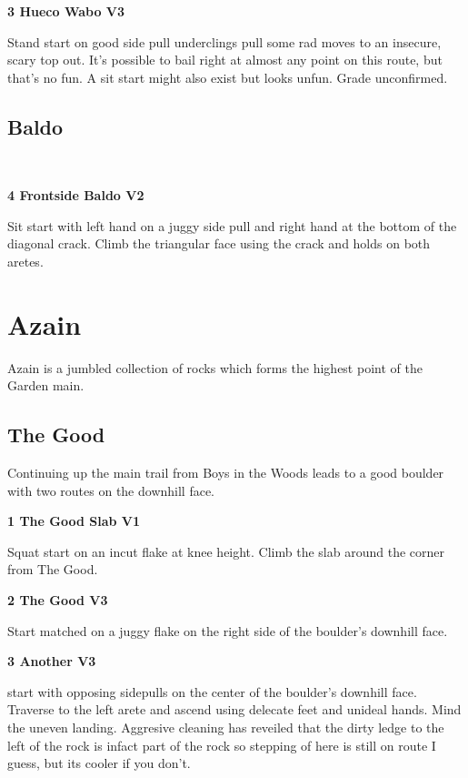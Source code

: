 \begin{multicols}{2}

					\label{rt:Hueco Wabo} \colorbox{green!20}{\textbf{3 Hueco Wabo V3  }}
					\begin{adjustwidth}{1cm}{}
					Stand start on good side pull underclings pull some rad moves to an insecure, scary top out. It's possible to bail right at almost any point on this route, but that's no fun. A sit start might also exist but looks unfun. Grade unconfirmed.
					\end{adjustwidth}
			\subsection*{Baldo}\label{bf:Baldo}
			\
			

					\label{rt:Frontside Baldo} \colorbox{green!20}{\textbf{4 Frontside Baldo V2 \ding{72}   }}
					\begin{adjustwidth}{1cm}{}
					Sit start with left hand on a juggy side pull and right hand at the bottom of the diagonal crack. Climb the triangular face using the crack and holds on both aretes.
					\end{adjustwidth}
		\section{Azain}\label{sa:Azain}
	Azain is a jumbled collection of rocks which forms the highest point of the Garden main.
			\subsection*{The Good}\label{bf:The Good}
			Continuing up the main trail from Boys in the Woods leads to a good boulder with two routes on the downhill face.
			
					\label{rt:The Good Slab} \colorbox{green!20}{\textbf{1 The Good Slab V1    }}
					\begin{adjustwidth}{1cm}{}
					Squat start on an incut flake at knee height. Climb the slab around the corner from The Good.
					\end{adjustwidth}
								\fullPic{./maps/topos/good_c.png}{The Good}

					\label{rt:The Good} \colorbox{green!20}{\textbf{2 The Good V3    }}
					\begin{adjustwidth}{1cm}{}
					Start matched on a juggy flake on the right side of the boulder's downhill face.
					\end{adjustwidth}
					\label{rt:Another} \colorbox{green!20}{\textbf{3 Another V3   \warn }}
					\begin{adjustwidth}{1cm}{}
					start with opposing sidepulls on the center of the boulder's downhill face. Traverse to the left arete and ascend using delecate feet and unideal hands. Mind the uneven landing. Aggresive cleaning has reveiled that the dirty ledge to the left of the rock is infact part of the rock so stepping of here is still on route I guess, but its cooler if you don't.
					\end{adjustwidth}

\end{multicols}
